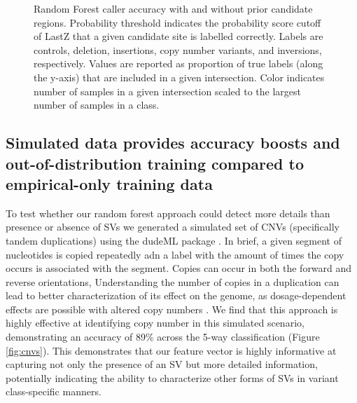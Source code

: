 \begin{figure}
    \centering
    \caption[Random Forest caller accuracy with and without prior candidate regions.]{Random Forest caller accuracy with and without prior candidate regions. Probability threshold indicates the probability score cutoff of LastZ that a given candidate site is labelled correctly. Labels are controls, deletion, insertions, copy number variants, and inversions, respectively. Values are reported as proportion of true labels (along the y-axis) that are included in a given intersection. Color indicates number of samples in a given intersection scaled to the largest number of samples in a class.}
    \label{fig:caller_comparison}
\end{figure}

\subsection{Simulated data provides accuracy boosts and out-of-distribution training compared to empirical-only training data}

To test whether our random forest approach could detect more details than presence or absence of SVs we generated a simulated set of CNVs (specifically tandem duplications) using the dudeML package \cite{hillDeepLearningApproach2019}. In brief, a given segment of nucleotides is copied repeatedly adn a label with the amount of times the copy occurs is associated with the segment. Copies can occur in both the forward and reverse orientations, Understanding the number of copies in a duplication can lead to better characterization of its effect on the genome, as dosage-dependent effects are possible with altered copy numbers \cite{fengzhangCopyNumberVariation2009}. We find that this approach is highly effective at identifying copy number in this simulated scenario, demonstrating an accuracy of 89\% across the 5-way classification (Figure \ref{fig:cnvs}). This demonstrates that our feature vector is highly informative at capturing not only the presence of an SV but more detailed information, potentially indicating the ability to characterize other forms of SVs in variant class-specific manners.

